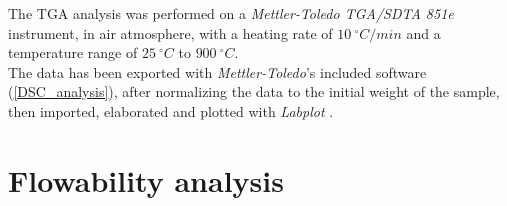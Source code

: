 \documentclass{article}
\begin{document}
            The TGA analysis was performed on a \textit{Mettler-Toledo TGA/SDTA 851e} \autocites{Mettler_Toledo} instrument, 
            in air atmosphere, with a heating rate of $10 \ ^{\circ}C/min$ and a temperature range of $25 \ ^{\circ}C$ to $900 \ ^{\circ}C$. \\

            The data has been exported with \textit{Mettler-Toledo}'s included software \autocites{Mettler_Toledo} (\ref{DSC_analysis}), after normalizing the data to the initial weight of the sample,
            then imported, elaborated and plotted with \textit{Labplot} \autocites{Labplot}. \\



%
        


    \clearpage

    \section{Flowability analysis\label{flowability_analysis}}
\end{document}
